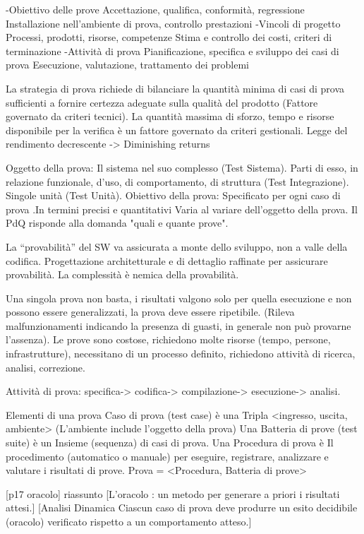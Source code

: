 \documentclass{report}
\begin{document}
-Obiettivo delle prove
Accettazione, qualifica, conformità, regressione
Installazione nell’ambiente di prova, controllo prestazioni
-Vincoli di progetto
Processi, prodotti, risorse, competenze
Stima e controllo dei costi, criteri di terminazione
-Attività di prova
Pianificazione, specifica e sviluppo dei casi di prova
Esecuzione, valutazione, trattamento dei problemi

La strategia di prova richiede di bilanciare la quantità minima di casi di prova sufficienti a fornire certezza adeguate sulla qualità del prodotto (Fattore governato da criteri tecnici).
La quantità massima di sforzo, tempo e risorse disponibile per la verifica è un fattore governato da criteri gestionali.
Legge del rendimento decrescente -> Diminishing returns

Oggetto della prova:
Il sistema nel suo complesso (Test Sistema). 
Parti di esso, in relazione funzionale, d’uso, di comportamento, di struttura (Test Integrazione). 
Singole unità (Test Unità).
Obiettivo della prova:
Specificato per ogni caso di prova .In termini precisi e quantitativi
Varia al variare dell’oggetto della prova. Il PdQ risponde alla domanda "quali e quante prove".

La “provabilità” del SW va assicurata a monte dello sviluppo, non a valle della codifica. Progettazione architetturale e di dettaglio raffinate per assicurare provabilità. La complessità è nemica della provabilità.

Una singola prova non basta, i risultati valgono solo per quella esecuzione e non possono essere generalizzati, la prova deve essere ripetibile.
(Rileva malfunzionamenti indicando la presenza di guasti, in generale non può provarne l’assenza).
Le prove sono costose, richiedono molte risorse (tempo, persone, infrastrutture), necessitano di un processo definito, richiedono attività di ricerca, analisi, correzione.

Attività di prova: specifica-> codifica-> compilazione-> esecuzione-> analisi.

Elementi di una prova
Caso di prova (test case) è una Tripla <ingresso, uscita, ambiente>
(L’ambiente include l’oggetto della prova)
Una Batteria di prove (test suite) è un Insieme (sequenza) di casi di prova.
Una Procedura di prova è Il procedimento (automatico o manuale) per eseguire, registrare, analizzare e valutare i risultati di prove.
Prova = <Procedura, Batteria di prove>

[p17 oracolo] riassunto [L’oracolo : un metodo per generare a priori i risultati attesi.]
[Analisi Dinamica Ciascun caso di prova deve produrre un esito decidibile (oracolo) verificato rispetto a un comportamento atteso.]
\end{document}
